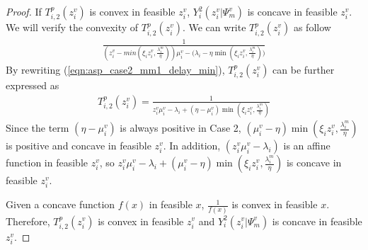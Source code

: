 \documentclass[conference]{IEEEtran}
\begin{document}
\begin{proof}
If $T_{i,2}^p(z_i^v)$ is convex in feasible $z_i^v$, $Y_i^2(z_i^v|\Psi_m^v)$ is concave in feasible $z_i^v$. We will verify the convexity of $T_{i,2}^p(z_i^v)$. We can write $T_{i,2}^p(z_i^v)$ as follow
\begin{equation} \label{eqn:asp_case2_mm1_delay_min}
\begin{aligned}
\frac{1}{(z_i^v-min(\xi_i z_i^v, \frac{\lambda_i^m}{\eta}))\mu_i^v - \big(\lambda_i - \eta\min(\xi_i z_i^v, \frac{\lambda_i^m}{\eta})\big)}
\end{aligned}
\end{equation}
By rewriting (\ref{eqn:asp_case2_mm1_delay_min}), $T_{i,2}^p(z_i^v)$ can be further expressed as
\begin{equation} \label{eqn:asp_case2_mm1_delay_min_new}
\begin{aligned}
T_{i,2}^p(z_i^v) = \frac{1}{z_i^v\mu_i^v - \lambda_i +(\eta - \mu_i^v)\min(\xi_i z_i^v, \frac{\lambda_i^m}{\eta})}
\end{aligned}
\end{equation}
Since the term $(\eta - \mu_i^v)$ is always positive in Case 2, $(\mu_i^v - \eta)\min(\xi_i z_i^v, \frac{\lambda_i^m}{\eta})$ is positive and concave in feasible $z_i^v$. In addition, $(z_i^v\mu_i^v - \lambda_i)$ is an affine function in feasible $z_i^v$, so $z_i^v\mu_i^v - \lambda_i+(\mu_i^v - \eta)\min(\xi_i z_i^v, \frac{\lambda_i^m}{\eta})$ is concave in feasible $z_i^v$\cite[Chapter~3.2]{boyd2004convex}.

Given a concave function $f(x)$ in feasible $x$, $\frac{1}{f(x)}$ is convex in feasible $x$. Therefore, $T_{i,2}^p(z_i^v)$ is convex in feasible $z_i^v$ and $Y_i^2(z_i^v|\Psi_m^v)$ is concave in feasible $z_i^v$.  \qedhere
\iffalse


\end{proof}
\end{document}
